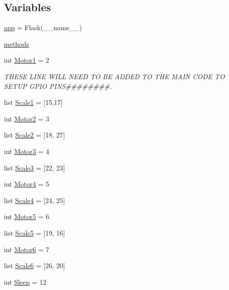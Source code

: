 \subsection*{Variables}
\begin{DoxyCompactItemize}
\item 
\hyperlink{namespaceserver_ad81539608721e4b8ffad6e7bb45dd34b}{app} = Flask(\+\_\+\+\_\+name\+\_\+\+\_\+)
\item 
\hyperlink{namespaceserver_a26c653098c4b10df9e71ee2da680daee}{methods}
\item 
int \hyperlink{namespaceserver_abf30f8bded9f548505f3493c335f2106}{Motor1} = 2
\begin{DoxyCompactList}\small\item\em T\+H\+E\+SE L\+I\+NE W\+I\+LL N\+E\+ED TO BE A\+D\+D\+ED TO T\+HE M\+A\+IN C\+O\+DE TO S\+E\+T\+UP G\+P\+IO P\+I\+NS\#\#\#\#\#\#\#\#. \end{DoxyCompactList}\item 
list \hyperlink{namespaceserver_a4dc79f107ff469954b71e2721c2e52b5}{Scale1} = \mbox{[}15,17\mbox{]}
\item 
int \hyperlink{namespaceserver_a00295ebb36b4f5010bd865f7f79ed840}{Motor2} = 3
\item 
list \hyperlink{namespaceserver_ab1c92a82b94362f20e2d00d9447f5490}{Scale2} = \mbox{[}18, 27\mbox{]}
\item 
int \hyperlink{namespaceserver_ab9a64d256e338e60c642657f058fe711}{Motor3} = 4
\item 
list \hyperlink{namespaceserver_afd40f5f5a35ccf0b353b7d4553df34b8}{Scale3} = \mbox{[}22, 23\mbox{]}
\item 
int \hyperlink{namespaceserver_afdb0b7fd94db47ff97518c814a37d65b}{Motor4} = 5
\item 
list \hyperlink{namespaceserver_af086972c970a98d91c403e604c9637e2}{Scale4} = \mbox{[}24, 25\mbox{]}
\item 
int \hyperlink{namespaceserver_a7ecb18c069c04be820a9f13b78239ad7}{Motor5} = 6
\item 
list \hyperlink{namespaceserver_ad6bed8ab0f9fed142bef6040df907d79}{Scale5} = \mbox{[}19, 16\mbox{]}
\item 
int \hyperlink{namespaceserver_a920ae2aa2476b38b98339a8c31a83250}{Motor6} = 7
\item 
list \hyperlink{namespaceserver_a85cc9bc47652d356467966a1c5a31b77}{Scale6} = \mbox{[}26, 20\mbox{]}
\item 
int \hyperlink{namespaceserver_afe680556fcbe382c4d1704864d6fdccb}{Sleep} = 12
\item 

\end{DoxyCompactItemize}
